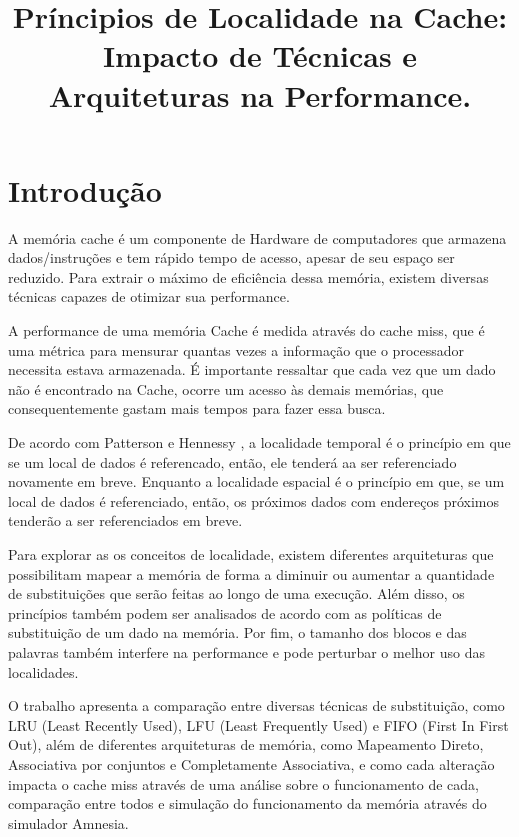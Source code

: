 \documentclass[conference]{IEEEtran}
\begin{document}
\title{Príncipios de Localidade na Cache: Impacto de Técnicas e Arquiteturas na Performance.\\

}

\author{
\and
{}
}

\maketitle

\section{Introdução}
A memória cache é um componente de Hardware de computadores que armazena dados/instruções e tem rápido tempo de acesso, apesar de seu espaço ser reduzido. Para extrair o máximo de eficiência dessa memória, existem diversas técnicas capazes de otimizar sua performance.

A performance de uma memória Cache é medida através do cache miss, que é uma métrica para mensurar quantas vezes a informação que o processador necessita estava armazenada. É importante ressaltar que cada vez que um dado não é encontrado na Cache, ocorre um acesso às demais memórias, que consequentemente gastam mais tempos para fazer essa busca.

De acordo com Patterson e Hennessy \cite{patterson2017}, a localidade temporal é o princípio em que se um local de dados é referencado, então, ele tenderá aa ser referenciado novamente em breve. Enquanto a localidade espacial é o princípio em que, se um local de dados é referenciado, então, os próximos dados com endereços próximos tenderão a ser referenciados em breve.

Para explorar as os conceitos de localidade, existem diferentes arquiteturas que possibilitam mapear a memória de forma a diminuir ou aumentar a quantidade de substituições que serão feitas ao longo de uma execução. Além disso, os princípios também podem ser analisados de acordo com as políticas de substituição de um dado na memória. Por fim, o tamanho dos blocos e das palavras também interfere na performance e pode perturbar o melhor uso das localidades.

O trabalho apresenta a comparação entre diversas técnicas de substituição, como LRU (Least Recently Used), LFU (Least Frequently Used) e FIFO (First In First Out), além de diferentes arquiteturas de memória, como Mapeamento Direto, Associativa por conjuntos e Completamente Associativa, e como cada alteração impacta o cache miss através de uma análise sobre o funcionamento de cada, comparação entre todos e simulação do funcionamento da memória através do simulador Amnesia.
\end{document}
